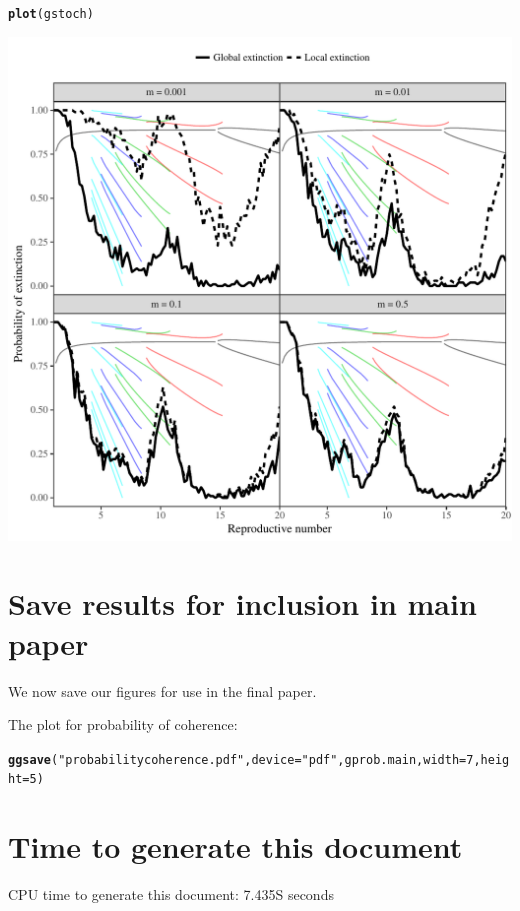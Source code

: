 \documentclass[12pt]{article}\usepackage[]{graphicx}\usepackage[]{color}
\makeatletter
\def\maxwidth{ %
  \ifdim\Gin@nat@width>\linewidth
    \linewidth
  \else
    \Gin@nat@width
  \fi
}
\newcommand{\hlnum}[1]{\textcolor[rgb]{0.686,0.059,0.569}{#1}}%
\newcommand{\hlstr}[1]{\textcolor[rgb]{0.192,0.494,0.8}{#1}}%
\newcommand{\hlstd}[1]{\textcolor[rgb]{0.345,0.345,0.345}{#1}}%
\newcommand{\hlkwc}[1]{\textcolor[rgb]{0.333,0.667,0.333}{#1}}%
\newcommand{\hlkwd}[1]{\textcolor[rgb]{0.737,0.353,0.396}{\textbf{#1}}}%
\newenvironment{kframe}{%
 \def\at@end@of@kframe{}%
 \ifinner\ifhmode%
  \def\at@end@of@kframe{\end{minipage}}%
  \begin{minipage}{\columnwidth}%
 \fi\fi%
 \def\FrameCommand##1{\hskip\@totalleftmargin \hskip-\fboxsep
 \colorbox{shadecolor}{##1}\hskip-\fboxsep
     \hskip-\linewidth \hskip-\@totalleftmargin \hskip\columnwidth}%
 \MakeFramed {\advance\hsize-\width
   \@totalleftmargin\z@ \linewidth\hsize
   \@setminipage}}%
 {\par\unskip\endMakeFramed%
 \at@end@of@kframe}
\newenvironment{knitrout}{}{} %
\makeatother
\begin{document}
\begin{knitrout}
\begin{kframe}
\begin{alltt}
\hlkwd{plot}\hlstd{(gstoch)}
\end{alltt}
\end{kframe}
\includegraphics[width=\maxwidth]{figure/unnamed-chunk-7-1} 

\end{knitrout}

\section{Save results for inclusion in main paper}

We now save our figures for use in the final paper.

The plot for probability of coherence:
\begin{knitrout}
\color{fgcolor}\begin{kframe}
\begin{alltt}
\hlkwd{ggsave}\hlstd{(}\hlstr{"probabilitycoherence.pdf"}\hlstd{,} \hlkwc{device}\hlstd{=} \hlstr{"pdf"}\hlstd{, gprob.main,} \hlkwc{width}\hlstd{=}\hlnum{7}\hlstd{,} \hlkwc{height} \hlstd{=} \hlnum{5}\hlstd{)}
\end{alltt}
\end{kframe}
\end{knitrout}

\section{Time to generate this document}



CPU time to generate this document: 7.435S seconds
\end{document}
